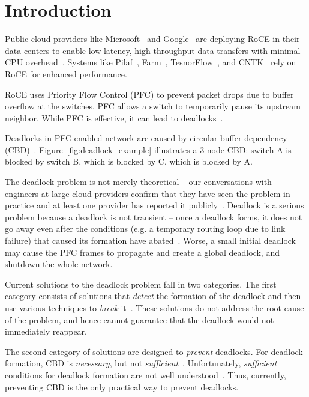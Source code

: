 \section{Introduction}
\label{sec:intro}

Public cloud providers like Microsoft~\cite{dcqcn} and Google~\cite{timely} are
deploying RoCE in their data centers to enable low latency, high throughput data
transfers with minimal CPU overhead~\cite{dcqcn}. Systems like
Pilaf~\cite{pilaf}, Farm~\cite{farm}, TesnorFlow~\cite{tensorflow}, and
CNTK~\cite{cntk} rely on RoCE for enhanced performance.

RoCE uses Priority Flow Control (PFC) to prevent packet drops due to buffer
overflow at the switches. PFC allows a switch to temporarily pause its upstream
neighbor. While PFC is effective, it can lead to
deadlocks~\cite{rdmaatscale,tcpbolt,hu2016deadlocks}.

Deadlocks in PFC-enabled network are caused by circular buffer dependency
(CBD)~\cite{hu2016deadlocks}. Figure~\ref{fig:deadlock_example} illustrates a
3-node CBD: switch A is blocked by switch B, which is blocked by C, which is
blocked by A.

The deadlock problem is not merely theoretical -- our conversations with
engineers at large cloud providers confirm that they have seen the problem in
practice and at least one provider has reported it publicly~\cite{rdmaatscale}.
Deadlock is a serious problem because a deadlock is not transient -- once a
deadlock forms, it does not go away even after the conditions (e.g. a temporary
routing loop due to link failure) that caused its formation have
abated~\cite{rdmaatscale}. Worse, a small initial deadlock may cause the PFC
frames to propagate and create a global deadlock, and shutdown the whole
network.

Current solutions to the deadlock problem fall in two categories. The first
category consists of solutions that {\em detect} the formation of the deadlock
and then use various techniques to {\em break} it~\cite{shpiner2016unlocking}.
These solutions do not address the root cause of the problem, and hence cannot
guarantee that the deadlock would not immediately reappear.

The second category of solutions are designed to {\em prevent} deadlocks.  For
deadlock formation, CBD is {\em necessary}, but not {\em
sufficient}~\cite{hu2016deadlocks}. Unfortunately, {\em sufficient} conditions
for deadlock formation are not well understood~\cite{hu2016deadlocks}. Thus,
currently, preventing CBD is the only practical way to prevent deadlocks.

